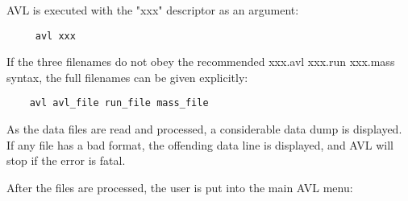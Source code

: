 AVL is executed with the "xxx" descriptor as an argument:
\begin{lstlisting}
	 avl xxx
\end{lstlisting}


If the three filenames do not obey the recommended xxx.avl xxx.run xxx.mass 
syntax, the full filenames can be given explicitly:
\begin{lstlisting}
	avl avl_file run_file mass_file
\end{lstlisting}
 
As the data files are read and processed, a considerable 
data dump is displayed.  If any file has a bad format,
the offending data line is displayed, and AVL will stop
if the error is fatal.

After the files are processed, the user is put into 
the main AVL menu:

